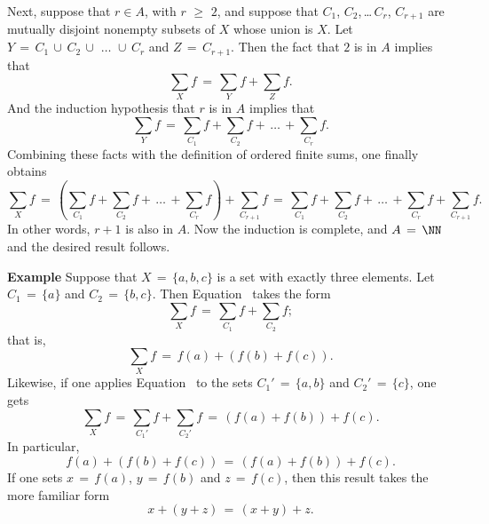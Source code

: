         Next, suppose that $r{\in}A$, with $r\,\,{\geq}\,\,2$, and suppose that $C_{1}$, $C_{2}$,\,{\ldots}\,$C_{r}$, $C_{r+1}$ are mutually disjoint nonempty subsets of $X$ whose union is $X$.
    Let $Y \,=\, C_{1}\,{\cup}\,C_{2}\,{\cup}\,\,{\ldots}\,\,{\cup}\,C_{r}$ and $Z \,=\, C_{r+1}$.
    Then the fact that $2$ is in $A$ implies that
        \begin{displaymath}
        {\sum}_{X} f \,=\, {\sum}_{Y} f + {\sum}_{Z} f.
        \end{displaymath}
    And the induction hypothesis that $r$ is in $A$ implies that
        \begin{displaymath}
        {\sum}_{Y} f \,=\, {\sum}_{C_{1}} f + {\sum}_{C_{2}} f + \,{\ldots}\,+ {\sum}_{C_{r}} f.
        \end{displaymath}
    Combining these facts with the definition of ordered finite sums, one finally obtains
        \begin{displaymath}
        {\sum}_{X} f \,=\, \left({\sum}_{C_{1}} f + {\sum}_{C_{2}} f + \,{\ldots}\,+ {\sum}_{C_{r}} f\right) + {\sum}_{C_{r+1}} f \,=\, 
    {\sum}_{C_{1}} f + {\sum}_{C_{2}} f + \,{\ldots}\,+ {\sum}_{C_{r}} f + {\sum}_{C_{r+1}} f.
        \end{displaymath}
    In other words, $r+1$ is also in $A$. Now the induction is complete, and $A \,=\, {\NN}$ and the desired result follows.

\V
\V


        {\bf Example} Suppose that $X \,=\, \{a,b,c\}$ is a set with exactly three elements.
    Let $C_{1} \,=\, \{a\}$ and $C_{2} \,=\, \{b,c\}$.
    Then Equation~ takes the form
        \begin{displaymath}
        {\sum}_{X} f \,=\, {\sum}_{C_{1}} f + {\sum}_{C_{2}} f;
        \end{displaymath}
    that is,
        \begin{displaymath}
        {\sum}_{X} f \,=\, f(a) + (f(b)+f(c)).
        \end{displaymath}
    Likewise, if one applies Equation~ to the sets $C_{1}' \,=\, \{a,b\}$ and $C_{2}' \,=\, \{c\}$, one gets
        \begin{displaymath}
        {\sum}_{X} f \,=\, {\sum}_{C_{1}'} f + {\sum}_{C_{2}'} f \,=\, (f(a)+f(b)) + f(c).
        \end{displaymath}
    In particular,
        \begin{displaymath}
        f(a) + (f(b)+f(c)) \,=\, (f(a)+f(b))+f(c).
        \end{displaymath}
    If one sets $x \,=\, f(a)$, $y \,=\, f(b)$ and $z \,=\, f(c)$, then this  result takes the more familiar form
        \begin{displaymath}
        x+(y+z) \,=\, (x+y)+z.
        \end{displaymath}

